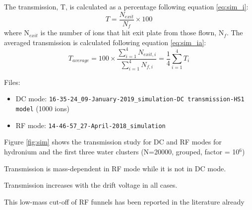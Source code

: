 The transmission, T, is calculated as a percentage following equation \ref{eq:sim_i}:
\begin{equation}
T = \frac{N_{exit}}{N_{f}} \times 100
\label{eq:sim_i}
\end{equation}
where N$_{exit}$ is the number of ions that hit exit plate from those flown, N$_f$. The averaged transmission is calculated following equation \ref{eq:sim_ia}:
\begin{equation}
T_{average} = 100 \times\frac{\sum_{i=1}^4 N_{exit,i}}{\sum_{i=1}^4 N_{f,i}} = \frac{1}{4}\sum_{i=1}^4T_i
\label{eq:sim_ia}
\end{equation}

Files:
\begin{itemize}
\item DC mode: \verb|16-35-24_09-January-2019_simulation-DC transmission-HS1 model| (1000 ions)
\item RF mode: \verb|14-46-57_27-April-2018_simulation|
\end{itemize}


Figure \ref{fig:sim} shows the transmission study for DC and RF modes for hydronium and the first three water clusters (N=20000, grouped, factor = 10$^6$)

Transmission is mass-dependent in RF mode while it is not in DC mode. 

Transmission increases with the drift voltage in all cases.

This low-mass cut-off of RF funnels has been reported in the literature already \cite{Chung123}



